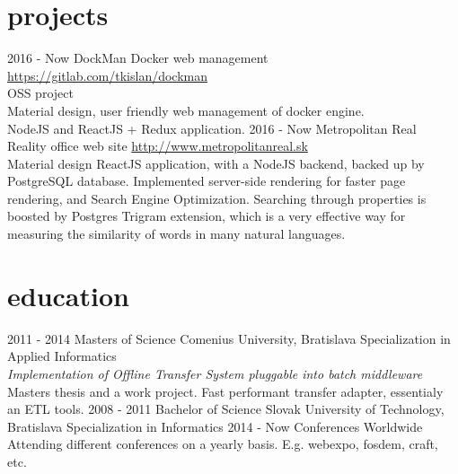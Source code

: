 \documentclass[]{friggeri-cv} %
\begin{document}

\section{projects}

\begin{entrylist}
\entry
{2016 - Now}
{DockMan}
{Docker web management}
{\url{https://gitlab.com/tkislan/dockman}
\\
OSS project
\\
Material design, user friendly web management of docker engine.
\\
NodeJS and ReactJS + Redux application.
}
\entry
{2016 - Now}
{Metropolitan Real}
{Reality office web site}
{\url{http://www.metropolitanreal.sk}
\\
Material design ReactJS application, with a NodeJS backend, backed up by PostgreSQL database. Implemented server-side rendering for faster page rendering, and Search Engine Optimization. Searching through properties is boosted by Postgres Trigram extension, which is a very effective way for measuring the similarity of words in many natural languages. 
}
\end{entrylist}

\newpage


\section{education}

\begin{entrylist}
\entry
{2011 - 2014}
{Masters {\normalfont of Science}}
{Comenius University, Bratislava}
{Specialization in Applied Informatics\\
\emph{Implementation of Offline Transfer System pluggable into batch middleware}\\ 
Masters thesis and a work project. Fast performant transfer adapter, essentialy an ETL tools.}
\entry
{2008 - 2011}
{Bachelor {\normalfont of Science}}
{Slovak University of Technology, Bratislava}
{Specialization in Informatics}
\entry
{2014 - Now}
{Conferences}
{Worldwide}
{Attending different conferences on a yearly basis. E.g. webexpo, fosdem, craft, etc.}
\end{entrylist}
\end{document}
